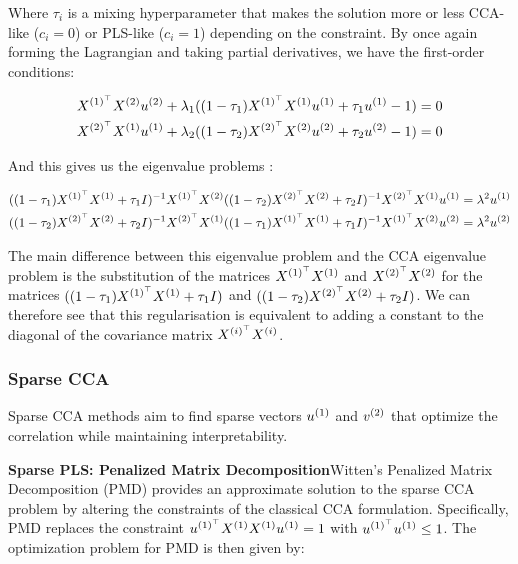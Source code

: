 Where \( \tau_i \) is a mixing hyperparameter that makes the solution more or less CCA-like (\( c_i = 0 \)) or PLS-like (\( c_i = 1 \)) depending on the constraint.
By once again forming the Lagrangian and taking partial derivatives, we have the first-order conditions:

\begin{align}
    & X^{(1)^{\top}} X^{(2)} u^{(2)} + \lambda_1 ((1-\tau_1) X^{(1)^{\top}} X^{(1)} u^{(1)} + \tau_1 u^{(1)} - 1) = 0 \\
    & X^{(2)^{\top}} X^{(1)} u^{(1)} + \lambda_2 ((1-\tau_2) X^{(2)^{\top}} X^{(2)} u^{(2)} + \tau_2 u^{(2)} - 1) = 0
\end{align}

And this gives us the eigenvalue problems \cite{rosipal2005overview}:

\begin{align}
    & ((1-\tau_1) X^{(1)^{\top}} X^{(1)} + \tau_1 I)^{-1} X^{(1)^{\top}} X^{(2)} ((1-\tau_2) X^{(2)^{\top}} X^{(2)} + \tau_2 I)^{-1} X^{(2)^{\top}} X^{(1)} u^{(1)} = \lambda^2 u^{(1)} \notag \\
    & ((1-\tau_2) X^{(2)^{\top}} X^{(2)} + \tau_2 I)^{-1} X^{(2)^{\top}} X^{(1)} ((1-\tau_1) X^{(1)^{\top}} X^{(1)} + \tau_1 I)^{-1} X^{(1)^{\top}} X^{(2)} u^{(2)} = \lambda^2 u^{(2)}
\end{align}

The main difference between this eigenvalue problem and the CCA eigenvalue problem is the substitution of the matrices \(X^{(1)^{\top}} X^{(1)}\) and \(X^{(2)^{\top}} X^{(2)}\) for the matrices \( ((1-\tau_1) X^{(1)^{\top}} X^{(1)} + \tau_1 I) \) and \( ((1-\tau_2) X^{(2)^{\top}} X^{(2)} + \tau_2 I) \).
We can therefore see that this regularisation is equivalent to adding a constant to the diagonal of the covariance matrix \(X^{(i)^{\top}} X^{(i)}\).

\subsubsection{Sparse CCA}

Sparse CCA methods aim to find sparse vectors \(u^{(1)}\) and \(v^{(2)}\) that optimize the correlation while maintaining interpretability.

\textbf{Sparse PLS: Penalized Matrix Decomposition}Witten's Penalized Matrix Decomposition (PMD) \cite{witten2009penalized} provides an approximate solution to the sparse CCA problem by altering the constraints of the classical CCA formulation.
Specifically, PMD replaces the constraint \(u^{(1)^{\top}} X^{(1)} X^{(1)} u^{(1)}=1\) with \(u^{(1)^{\top}} u^{(1)} \leq 1\).
The optimization problem for PMD is then given by:

